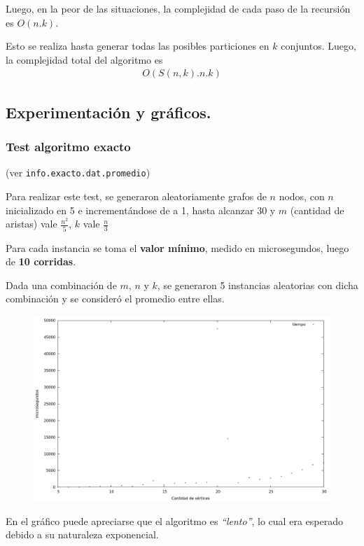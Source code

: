 Luego, en la peor de las situaciones, la complejidad de cada paso de la
recursión es $O(n . k)$.

Esto se realiza hasta generar todas las posibles particiones en $k$ conjuntos.
Luego, la complejidad total del algoritmo es
\begin{align*}
  O(S(n, k) . n . k)
\end{align*}


\newpage \subsection{Experimentación y gráficos.}
\vspace*{0.3cm}

\subsubsection{Test algoritmo exacto}

(ver \verb|info.exacto.dat.promedio|) \medskip

Para realizar este test, se generaron aleatoriamente grafos de $n$ nodos, con  $n$ inicializado en 5 e incrementándose de a 1, hasta alcanzar 30 y $m$
(cantidad de aristas) vale $\frac{n^2}{5}$, $k$ vale $\frac{n}{3}$

Para cada instancia se toma el \textbf{valor mínimo}, medido en microsegundos, luego de \textbf{10 corridas}.

Dada una combinación de $m$, $n$ y $k$, se generaron 5 instancias aleatorias con dicha combinación y se consideró el promedio entre ellas.

\vspace*{0.5cm}

\begin{figure}[h]
  \begin{center}
    \includegraphics[scale=0.35]{imagenes/grafico-exacto.png}
  \end{center}
\end{figure}

\vspace*{0.5cm}

En el gráfico puede apreciarse que el algoritmo es \textit{``lento''}, lo cual era esperado debido a su naturaleza exponencial.

